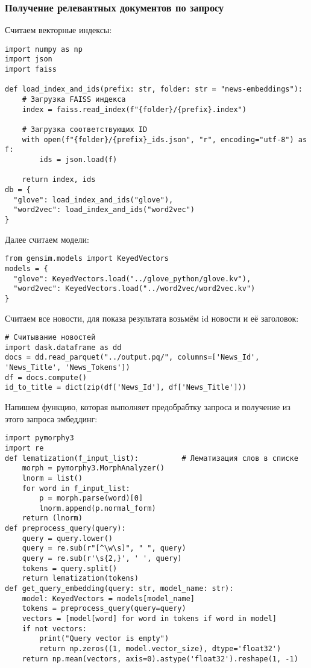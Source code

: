 \documentclass[coursework]{SCWorks}
\begin{document}
\subsubsection{Получение релевантных документов по запросу}

Считаем векторные индексы:
\begin{verbatim}
import numpy as np
import json
import faiss

def load_index_and_ids(prefix: str, folder: str = "news-embeddings"):
    # Загрузка FAISS индекса
    index = faiss.read_index(f"{folder}/{prefix}.index")
    
    # Загрузка соответствующих ID
    with open(f"{folder}/{prefix}_ids.json", "r", encoding="utf-8") as f:
        ids = json.load(f)
    
    return index, ids
db = {
  "glove": load_index_and_ids("glove"),
  "word2vec": load_index_and_ids("word2vec")
}
\end{verbatim}

Далее считаем модели:
\begin{verbatim}
from gensim.models import KeyedVectors
models = {
  "glove": KeyedVectors.load("../glove_python/glove.kv"),
  "word2vec": KeyedVectors.load("../word2vec/word2vec.kv")
}
\end{verbatim}

Считаем все новости, для показа результата возьмём id новости и её заголовок:
\begin{verbatim}
# Считывание новостей
import dask.dataframe as dd
docs = dd.read_parquet("../output.pq/", columns=['News_Id', 'News_Title', 'News_Tokens'])
df = docs.compute()
id_to_title = dict(zip(df['News_Id'], df['News_Title']))
\end{verbatim}

Напишем функцию, которая выполняет предобрабтку запроса и получение из этого запроса эмбеддинг:
\begin{verbatim}
import pymorphy3
import re
def lematization(f_input_list):          # Лематизация слов в списке
    morph = pymorphy3.MorphAnalyzer()
    lnorm = list()
    for word in f_input_list:
        p = morph.parse(word)[0]
        lnorm.append(p.normal_form)
    return (lnorm)
def preprocess_query(query):
    query = query.lower()
    query = re.sub(r"[^\w\s]", " ", query)
    query = re.sub(r'\s{2,}', ' ', query)
    tokens = query.split()
    return lematization(tokens)
def get_query_embedding(query: str, model_name: str):
    model: KeyedVectors = models[model_name]
    tokens = preprocess_query(query=query)
    vectors = [model[word] for word in tokens if word in model]
    if not vectors:
        print("Query vector is empty")
        return np.zeros((1, model.vector_size), dtype='float32')
    return np.mean(vectors, axis=0).astype('float32').reshape(1, -1)
\end{verbatim}
\end{document}
